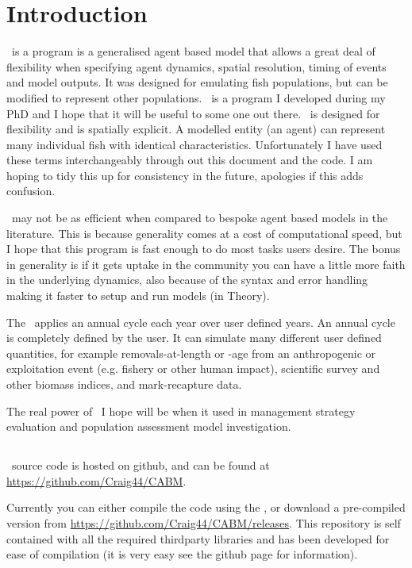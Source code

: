 \section{Introduction\label{sec:Introduction}} 

\IBM\ is a program is a generalised agent based model that allows a great deal of flexibility when specifying agent dynamics, spatial resolution, timing of events and model outputs. It was designed for emulating fish populations, but can be modified to represent other populations. \IBM\ is a program I developed during my PhD and I hope that it will be useful to some one out there. \IBM\ is designed for flexibility and is spatially explicit. A modelled entity (an agent) can represent many individual fish with identical characteristics. Unfortunately I have used these terms interchangeably through out this document and the code. I am hoping to tidy this up for consistency in the future, apologies if this adds confusion.

\IBM\ may not be as efficient when compared to bespoke agent based models in the literature. This is because generality comes at a cost of computational speed, but I hope that this program is fast enough to do most tasks users desire. The bonus in generality is if it gets uptake in the community you can have a little more faith in the underlying dynamics, also because of the syntax and error handling making it faster to setup and run models (in Theory).

The \IBM\ applies an annual cycle each year over user defined years. An annual cycle is completely defined by the user. It can simulate many different user defined quantities, for example removals-at-length or -age from an anthropogenic or exploitation event (e.g. fishery or other human impact), scientific survey and other biomass indices, and mark-recapture data.

The real power of \IBM\ I hope will be when it used in management strategy evaluation and population assessment model investigation.

\subsection{}
\IBM\ source code is hosted on github, and can be found at \url{https://github.com/Craig44/CABM}.

Currently you can either compile the code using the , or download a pre-compiled version from \url{https://github.com/Craig44/CABM/releases}. This repository is self contained with all the required thirdparty libraries and has been developed for ease of compilation (it is very easy see the github page for information). 

